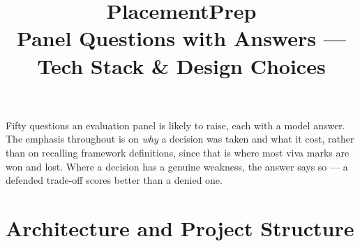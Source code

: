\documentclass[11pt,a4paper]{article}
\title{\vspace{-2.2em}\textbf{PlacementPrep}\\[0.35em]
  \large\normalfont Panel Questions with Answers --- Tech Stack \& Design Choices}
\author{}
\date{}
\begin{document}
\maketitle
\thispagestyle{fancy}
\vspace{-3em}

\noindent\color{muted}\small
Fifty questions an evaluation panel is likely to raise, each with a model answer.
The emphasis throughout is on \emph{why} a decision was taken and what it cost,
rather than on recalling framework definitions, since that is where most viva
marks are won and lost. Where a decision has a genuine weakness, the answer says
so --- a defended trade-off scores better than a denied one.
\color{ink}\normalsize
\vspace{0.4em}

\section{Architecture and Project Structure}
\end{document}
